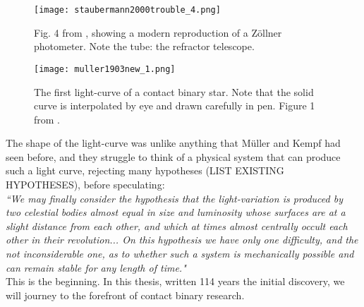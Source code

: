 \documentclass[12pt]{article} %
\numberwithin{equation}{section} %
\begin{document}
\begin{figure}[H]
\centering
\texttt{[image: staubermann2000trouble\_4.png]}
\caption{Fig. 4 from \citet{staubermann2000trouble}, showing a modern reproduction of a Z\"ollner photometer. Note the tube: the refractor telescope.}
\label{fig: staubermann2000trouble_4}
\end{figure}

\begin{figure}[H]
\centering
\texttt{[image: muller1903new\_1.png]}
\caption{The first light-curve of a contact binary star. Note that the solid curve is interpolated by eye and drawn carefully in pen. Figure 1 from \citet{muller1903new}.}
\label{fig: muller1903new_1}
\end{figure}

The shape of the light-curve was unlike anything that M\"uller and Kempf had seen before, and they struggle to think of a physical system that can produce such a light curve, rejecting many hypotheses (LIST EXISTING HYPOTHESES), before speculating: \\

\emph{``We may finally consider the hypothesis that the light-variation is produced by two celestial bodies almost equal in size and luminosity whose surfaces are at a slight distance from each other, and which at times almost centrally occult each other in their revolution... On this hypothesis we have only one difficulty, and the not inconsiderable one, as to whether such a system is mechanically possible and can remain stable for any length of time."} \\

This is the beginning. In this thesis, written 114 years the initial discovery, we will journey to the forefront of contact binary research.



\end{document}
